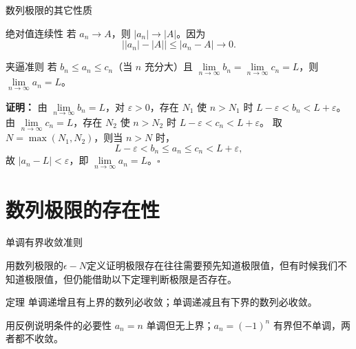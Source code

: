 \documentclass[aspectratio=169,10pt]{ctexbeamer}
\begin{document}
\begin{frame}{数列极限的其它性质}

	\begin{block}{绝对值连续性}
		若 $a_n\to A$，则 $|a_n|\to|A|$。因为
		\[
		\bigl||a_n|-|A|\bigr|\le|a_n-A|\to0.
		\]
	\end{block}
  \begin{block}{夹逼准则}
    若 \(b_n \leq a_n \leq c_n\)（当 \(n\) 充分大）且 \(\lim\limits_{n \to \infty} b_n = \lim\limits_{n \to \infty} c_n = L\)，则 \(\lim\limits_{n \to \infty} a_n = L\)。
  \end{block}
 
  \textbf{证明：}
    由 \(\lim \limits_{n \to \infty} b_n = L\)，对 \(\varepsilon > 0\)，存在 \(N_1\) 使 \(n > N_1\) 时 \(L - \varepsilon < b_n < L + \varepsilon\)。
    由 \(\lim\limits_{n \to \infty} c_n = L\)，存在 \(N_2\) 使 \(n > N_2\) 时 \(L - \varepsilon < c_n < L + \varepsilon\)。
    取 \(N = \max(N_1, N_2)\)，则当 \(n > N\) 时，
    \[
    L - \varepsilon < b_n \leq a_n \leq c_n < L + \varepsilon,
    \]
    故 \(|a_n - L| < \varepsilon\)，即 \(\lim \limits_{n \to \infty}a_n = L\)。\(\square\)
  
\end{frame}


\section{数列极限的存在性}




\begin{frame}{单调有界收敛准则}
	

  用数列极限的$\epsilon - N$定义证明极限存在往往需要预先知道极限值，但有时候我们不知道极限值，但仍能借助以下定理判断极限是否存在。
  
  \vspace{0.6cm}
  \begin{block}{定理}
    单调递增且有上界的数列必收敛；单调递减且有下界的数列必收敛。
  \end{block}
  \vspace{0.6cm}
  \begin{alertblock}{用反例说明条件的必要性}
    $a_n=n$ 单调但无上界；$a_n=(-1)^n$ 有界但不单调，两者都不收敛。
  \end{alertblock}
\end{frame}
\end{document}
